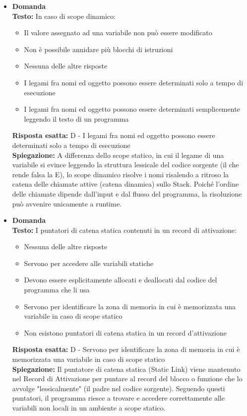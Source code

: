 \documentclass[12pt, a4paper]{article}
\newcounter{domandateoria}
\begin{document}
\begin{itemize}
    \item {}\textbf{Domanda \thedomandateoria} \\
    \textbf{Testo:} In caso di scope dinamico:
    \begin{itemize}
        \item[A)] Il valore assegnato ad una variabile non può essere modificato
        \item[B)] Non è possibile annidare più blocchi di istruzioni
        \item[C)] Nessuna delle altre risposte
        \item[D)] I legami fra nomi ed oggetto possono essere determinati solo a tempo di esecuzione
        \item[E)] I legami fra nomi ed oggetto possono essere determinati semplicemente leggendo il testo di un programma
    \end{itemize}
    \textbf{Risposta esatta:} D - I legami fra nomi ed oggetto possono essere determinati solo a tempo di esecuzione \\
    \textbf{Spiegazione:} A differenza dello scope statico, in cui il legame di una variabile si evince leggendo la struttura lessicale del codice sorgente (il che rende falsa la E), lo scope dinamico risolve i nomi risalendo a ritroso la catena delle chiamate attive (catena dinamica) sullo Stack. Poiché l'ordine delle chiamate dipende dall'input e dal flusso del programma, la risoluzione può avvenire unicamente a runtime.
    \vspace{0.3cm}

\newpage

    \item {}\textbf{Domanda \thedomandateoria} \\
    \textbf{Testo:} I puntatori di catena statica contenuti in un record di attivazione:
    \begin{itemize}
        \item[A)] Nessuna delle altre risposte
        \item[B)] Servono per accedere alle variabili statiche
        \item[C)] Devono essere esplicitamente allocati e deallocati dal codice del programma che li usa
        \item[D)] Servono per identificare la zona di memoria in cui è memorizzata una variabile in caso di scope statico
        \item[E)] Non esistono puntatori di catena statica in un record d'attivazione
    \end{itemize}
    \textbf{Risposta esatta:} D - Servono per identificare la zona di memoria in cui è memorizzata una variabile in caso di scope statico \\
    \textbf{Spiegazione:} Il puntatore di catena statica (Static Link) viene mantenuto nel Record di Attivazione per puntare al record del blocco o funzione che lo avvolge "lessicalmente" (il padre nel codice sorgente). Seguendo questi puntatori, il programma riesce a trovare e accedere correttamente alle variabili non locali in un ambiente a scope statico.
    \vspace{0.3cm}


\end{itemize}
\end{document}
